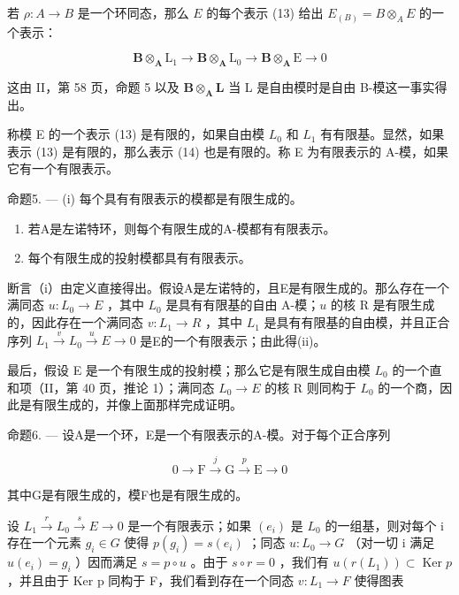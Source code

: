 若 \(\rho: A \to B\) 是一个环同态，那么 \(E\) 的每个表示 (13) 给出 \(E_{(B)} = B \otimes_A E\) 的一个表示：

\[
\mathbf {B} \otimes_ {\mathbf {A}} \mathrm{L} _ {1} \rightarrow \mathbf {B} \otimes_ {\mathbf {A}} \mathrm{L} _ {0} \rightarrow \mathbf {B} \otimes_ {\mathbf {A}} \mathrm{E} \rightarrow 0\tag{14}
\]

这由 II，第 58 页，命题 5 以及 \(\mathbf{B} \otimes_{\mathbf{A}} \mathbf{L}\) 当 L 是自由模时是自由 B-模这一事实得出。

称模 E 的一个表示 (13) 是有限的，如果自由模 \(L_{0}\) 和 \(L_{1}\) 有有限基。显然，如果表示 (13) 是有限的，那么表示 (14) 也是有限的。称 E 为有限表示的 A-模，如果它有一个有限表示。

命题5. --- (i) 每个具有有限表示的模都是有限生成的。

\begin{enumerate}
\def\labelenumi{(\roman{enumi})}
\setcounter{enumi}{1}
\item
  若A是左诺特环，则每个有限生成的A-模都有有限表示。
\item
  每个有限生成的投射模都具有有限表示。
\end{enumerate}

断言（i）由定义直接得出。假设A是左诺特的，且E是有限生成的。那么存在一个满同态 \(u: L_0 \to E\) ，其中 \(L_0\) 是具有有限基的自由 A-模；\(u\) 的核 R 是有限生成的，因此存在一个满同态 \(v: L_1 \to R\) ，其中 \(L_1\) 是具有有限基的自由模，并且正合序列 \(L_1 \xrightarrow{v} L_0 \xrightarrow{u} E \longrightarrow 0\) 是E的一个有限表示；由此得(ii)。

最后，假设 E 是一个有限生成的投射模；那么它是有限生成自由模 \(L_{0}\) 的一个直和项（II，第 40 页，推论 1）；满同态 \(L_{0} \rightarrow E\) 的核 R 则同构于 \(L_{0}\) 的一个商，因此是有限生成的，并像上面那样完成证明。

命题6. --- 设A是一个环，E是一个有限表示的A-模。对于每个正合序列

\[
0 \longrightarrow \mathrm{F} \stackrel {j} {\longrightarrow} \mathrm{G} \stackrel {p} {\longrightarrow} \mathrm{E} \longrightarrow 0
\]

其中G是有限生成的，模F也是有限生成的。

设 \(L_{1} \xrightarrow{r} L_{0} \xrightarrow{s} E \longrightarrow 0\) 是一个有限表示；如果 \((e_{i})\) 是 \(L_{0}\) 的一组基，则对每个 i 存在一个元素 \(g_{i} \in G\) 使得 \(p(g_{i}) = s(e_{i})\) ；同态 \(u : L_{0} \to G\) （对一切 i 满足 \(u(e_{i}) = g_{i}\) ）因而满足 \(s = p \circ u\) 。由于 \(s \circ r = 0\) ，我们有 \(u(r(L_{1})) \subset \operatorname{Ker} p\) ，并且由于 Ker p 同构于 F，我们看到存在一个同态 \(v : L_{1} \to F\) 使得图表

